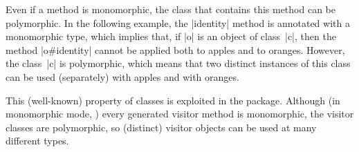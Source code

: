 \documentclass[11pt,a4paper,twoside]{article}
\begin{document}
Even if a method is monomorphic, the class that contains this method can be
polymorphic. In the following example, the \oc|identity| method is annotated
with a monomorphic type, which implies that, if \oc|o| is an object of
class~\oc|c|, then the method \oc|o#identity| cannot be applied both to apples
and to oranges. However, the class~\oc|c| is polymorphic, which means that two
distinct instances of this class can be used (separately) with apples and with
oranges.
\begin{origenv}

\end{origenv}
This (well-known) property of classes is exploited in the \visitors package.
Although (in monomorphic mode, ) every
generated visitor method is monomorphic, the visitor classes are
polymorphic, so (distinct) visitor objects can be used at many different
types.



\begin{comment}

\subsection{Customization from above and from below}

In the object-oriented world, a traditional way of ensuring that a piece of
code has customizable behavior is to write it in the form of a class with many
(concrete or virtual) methods. These methods can later be overridden in a
subclass: this is ``customization from below''.

When the class is automatically generated, as is the case of our visitor
classes, another approach to customization is to let the user choose which
classes should be inherited: this is done via the \ancestors parameter
(\sref{sec:params}). This is ``customization from above''. It is a somewhat
more unusual customization mechanism.

As the (concrete and virtual) methods that we generate must be monomorphic,
customization from below is restricted, in our situation, to providing
monomorphic code fragments. Fortunately, no such restriction bears on
customization from above: a parent class can provide (hand-written)
polymorphic methods.

For this reason, customization from above plays a key role in our setting. For
instance, the methods \oc|visit_array|, \oc|visit_list|, and so on, which must
be polymorphic, must be hand-written, and must be inherited from a parent
class. The asymmetry between hand-written methods (which may be polymorphic)
and generated methods (which must be monomorphic) is admittedly unfortunate,
but this is the best that we offer, at present.

\end{comment}
\end{document}
